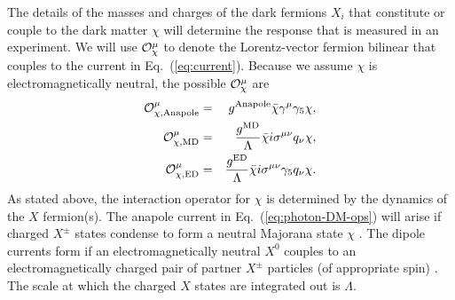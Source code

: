 \documentclass[11pt]{article}
\newcommand{\Eq}[1]{Eq.~(\ref{#1})} \newcommand{\Eqs}[2]{Eqs.~(\ref{#1}) and (\ref{#2})} \newcommand{\Eqm}[2]{Eqs.~(\ref{#1}) through (\ref{#2})}
\begin{document}
The details of the masses and charges of the dark fermions $X_i$ that constitute or couple to the dark matter $\chi$ will determine the response that is measured in an experiment. We will use ${\cal O}_\chi^\mu$ to denote the Lorentz-vector fermion bilinear that couples to the current in \Eq{eq:current}. Because we assume $\chi$ is electromagnetically neutral, the possible ${\cal O}_\chi^\mu$ are \cite{Gresham:2014vja, Gluscevic:2015sqa}
\begin{eqnarray} \label{eq:photon-DM-ops}
{\cal O}_{\rm \chi, Anapole}^\mu & = & g^{\rm Anapole}\bar \chi \gamma^\mu \gamma_5 \chi, \\
{\cal O}_{\rm \chi, MD}^\mu & = & \frac{g^{\rm MD}}{\Lambda}\bar \chi i \sigma^{\mu \nu} q_\nu \chi ,\\
{\cal O}_{\rm \chi, ED}^\mu & = & \frac{g^{\rm ED}}{\Lambda} \bar \chi i \sigma^{\mu \nu} \gamma_5 q_\nu \chi.
\end{eqnarray}
As stated above, the interaction operator for $\chi$ is determined by the dynamics of the $X$ fermion(s). The anapole current in \Eq{eq:photon-DM-ops} will arise if charged $X^\pm$ states condense to form a neutral Majorana state $\chi$ \cite{Bagnasco:1993st}. The dipole currents form if an electromagnetically neutral $X^0$ couples to an electromagnetically charged pair of partner $X^\pm$ particles (of appropriate spin) \cite{Weiner:2012gm}. The scale at which the charged $X$ states are integrated out is $\Lambda$.
\end{document}
